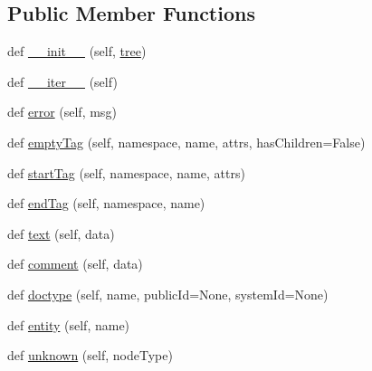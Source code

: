 \subsection*{Public Member Functions}
\begin{DoxyCompactItemize}
\item 
def \hyperlink{classpip_1_1__vendor_1_1html5lib_1_1treewalkers_1_1base_1_1TreeWalker_a5f107b49def5929a4c0aa39b4db7196f}{\+\_\+\+\_\+init\+\_\+\+\_\+} (self, \hyperlink{classpip_1_1__vendor_1_1html5lib_1_1treewalkers_1_1base_1_1TreeWalker_a687cbb77f22cf4bd25d91dc52e8da681}{tree})
\item 
def \hyperlink{classpip_1_1__vendor_1_1html5lib_1_1treewalkers_1_1base_1_1TreeWalker_adca1c17a737987267c1a5f9d5fe0cc0e}{\+\_\+\+\_\+iter\+\_\+\+\_\+} (self)
\item 
def \hyperlink{classpip_1_1__vendor_1_1html5lib_1_1treewalkers_1_1base_1_1TreeWalker_aed90492e5fc3449c9530531238aad993}{error} (self, msg)
\item 
def \hyperlink{classpip_1_1__vendor_1_1html5lib_1_1treewalkers_1_1base_1_1TreeWalker_adb45eb58b7c9dc77a1d059a8f75b8ccf}{empty\+Tag} (self, namespace, name, attrs, has\+Children=False)
\item 
def \hyperlink{classpip_1_1__vendor_1_1html5lib_1_1treewalkers_1_1base_1_1TreeWalker_a856cb47dbeacd8f1ed7a3daed61491d8}{start\+Tag} (self, namespace, name, attrs)
\item 
def \hyperlink{classpip_1_1__vendor_1_1html5lib_1_1treewalkers_1_1base_1_1TreeWalker_a604859d9a761510d7611c9196a45afe6}{end\+Tag} (self, namespace, name)
\item 
def \hyperlink{classpip_1_1__vendor_1_1html5lib_1_1treewalkers_1_1base_1_1TreeWalker_a0a33de7f434938befd593353fb6cf030}{text} (self, data)
\item 
def \hyperlink{classpip_1_1__vendor_1_1html5lib_1_1treewalkers_1_1base_1_1TreeWalker_a15701795d9b411c1949b2cad210298cc}{comment} (self, data)
\item 
def \hyperlink{classpip_1_1__vendor_1_1html5lib_1_1treewalkers_1_1base_1_1TreeWalker_abc5d1c504158c353d9461a125569bd31}{doctype} (self, name, public\+Id=None, system\+Id=None)
\item 
def \hyperlink{classpip_1_1__vendor_1_1html5lib_1_1treewalkers_1_1base_1_1TreeWalker_a120a3a4ac6ec4016efe1bd5b86aeb52e}{entity} (self, name)
\item 
def \hyperlink{classpip_1_1__vendor_1_1html5lib_1_1treewalkers_1_1base_1_1TreeWalker_a460c48a4ce52afe6ed79fbf334307249}{unknown} (self, node\+Type)
\end{DoxyCompactItemize}

